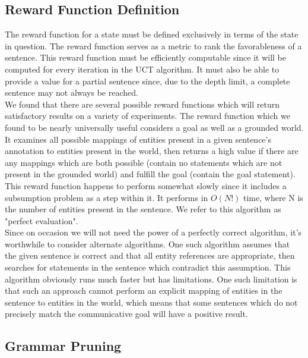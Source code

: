  \subsection{Reward Function Definition}

 The reward function for a state must be defined exclusively in terms
 of the state in question.  The reward function serves as a metric to
 rank the favorableness of a sentence.  This reward function must be
 efficiently computable since it will be computed for every iteration
 in the UCT algorithm.  It must also be able to provide a value for a
 partial sentence since, due to the depth limit, a complete sentence
 may not always be reached.\\
 
 We found that there are several possible reward functions which will
 return satisfactory results on a variety of experiments.  The reward function
 which we found to be nearly universally useful considers a goal as well as a 
 grounded world.  It examines all possible mappings of entities present in
 a given sentence's annotation to entities present in the world, then returns
 a high value if there are any mappings which are both possible (contain no statements
 which are not present in the grounded world) and fulfill the goal (contain the
 goal statement).\\

This reward function happens to perform somewhat slowly since it includes
a subsumption problem as a step within it.  It performs in $O(N!)$ time, where
N is the number of entities present in the sentence.  We refer to this algorithm as
"perfect evaluation".\\

Since on occasion we will not need the power of a perfectly correct algorithm,
it's worthwhile to consider alternate algorithms.  One such algorithm assumes that
the given sentence is correct and that all entity references are appropriate, then
searches for statements in the sentence which contradict this assumption.  This
algorithm obviously runs much faster but has limitations.  One such limitation is
that such an approach cannot perform an explicit mapping of entities in the sentence
to entities in the world, which means that some sentences which do not precisely
match the communicative goal will have a positive result.

\subsection{Grammar Pruning}

